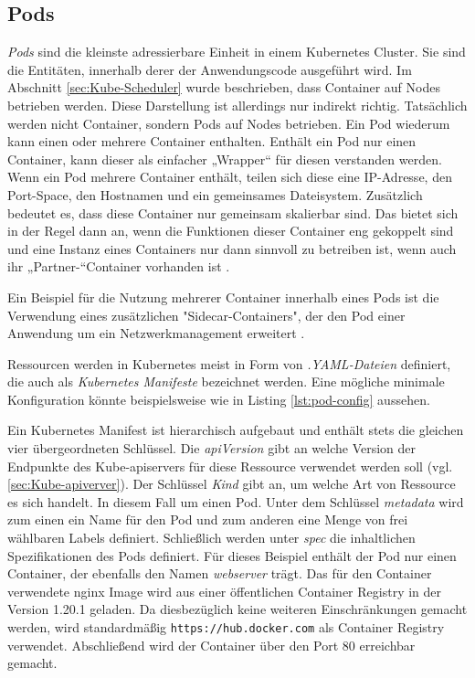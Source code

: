 \documentclass[11pt,a4paper]{article}
\begin{document}
\subsection{Pods}
\emph{Pods} sind die kleinste adressierbare Einheit in einem Kubernetes Cluster.
Sie sind die Entitäten, innerhalb derer der Anwendungscode ausgeführt wird.
Im Abschnitt \ref{sec:Kube-Scheduler} wurde beschrieben, dass Container auf Nodes betrieben werden.
Diese Darstellung ist allerdings nur indirekt richtig. Tatsächlich werden nicht Container,
sondern Pods auf Nodes betrieben.
Ein Pod wiederum kann einen oder mehrere Container enthalten. Enthält ein Pod nur einen Container,
kann dieser als einfacher „Wrapper“ für diesen verstanden werden.
Wenn ein Pod mehrere Container enthält, teilen sich diese eine IP-Adresse,
den Port-Space, den Hostnamen und ein gemeinsames Dateisystem.
Zusätzlich bedeutet es, dass diese Container nur gemeinsam skalierbar sind.
Das bietet sich in der Regel dann an, wenn die Funktionen dieser Container eng gekoppelt sind und eine Instanz eines
Containers nur dann sinnvoll zu betreiben ist, wenn auch ihr „Partner-“Container vorhanden ist \cite{9783969109625} \cite{Schmeling_Dargatz_2022}.

Ein Beispiel für die Nutzung mehrerer Container innerhalb eines Pods ist die Verwendung
eines zusätzlichen "Sidecar-Containers", der den Pod einer Anwendung um ein Netzwerkmanagement erweitert \cite{9783969109625}.

Ressourcen werden in Kubernetes meist in Form von \emph{.YAML-Dateien} definiert,
die auch als \emph{Kubernetes Manifeste} bezeichnet werden.
Eine mögliche minimale Konfiguration könnte beispielsweise wie in Listing \ref{lst:pod-config} aussehen.



Ein Kubernetes Manifest ist hierarchisch aufgebaut
und enthält stets die gleichen vier übergeordneten Schlüssel.
Die \emph{apiVersion} gibt an welche Version der Endpunkte des Kube-apiservers für diese Ressource
verwendet werden soll (vgl. \ref{sec:Kube-apiverver}).
Der Schlüssel \emph{Kind} gibt an, um welche Art von Ressource es sich handelt.
In diesem Fall um einen Pod.
Unter dem Schlüssel \emph{metadata} wird zum einen ein Name für den Pod
und zum anderen eine Menge von frei wählbaren Labels definiert.
Schließlich werden unter \emph{spec} die inhaltlichen Spezifikationen des Pods
definiert. Für dieses Beispiel enthält der Pod nur einen Container, der ebenfalls den Namen
\emph{webserver} trägt. Das für den Container verwendete nginx Image \cite{nginx} wird aus einer
öffentlichen Container Registry in der Version 1.20.1 geladen. Da diesbezüglich keine weiteren
Einschränkungen gemacht werden, wird standardmäßig \linebreak \lstinline|https://hub.docker.com| als Container Registry
verwendet. Abschließend wird der Container über den Port 80 erreichbar gemacht. \cite{Schmeling_Dargatz_2022}
\end{document}
